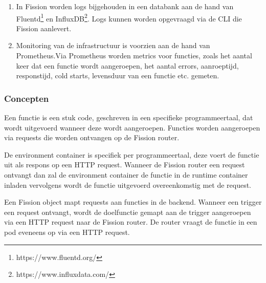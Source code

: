 \begin{enumerate}
    \item In Fission worden logs bijgehouden in een databank aan de hand van Fluentd\footnote{https://www.fluentd.org/} en InfluxDB\footnote{https://www.influxdata.com/}. Logs kunnen worden opgevraagd via de CLI die Fission aanlevert.
    \item Monitoring van de infrastructuur is voorzien aan de hand van Prometheus.Via Prometheus worden metrics voor functies, zoals het aantal keer dat een functie wordt aangeroepen, het aantal errors, aanroeptijd, responstijd, cold starts, levensduur van een functie etc. gemeten.
\end{enumerate}

\subsubsection{Concepten}
\begin{description}[style=unboxed, labelwidth=\linewidth, listparindent =0pt]
    \item[Functie]
    Een functie is een stuk code, geschreven in een specifieke programmeertaal, dat wordt uitgevoerd wanneer deze wordt aangeroepen. Functies worden aangeroepen via requests die worden ontvangen op de Fission router. \autocite{Fission2018}
    \\
    
    \item[Environment]
    De environment container is specifiek per programmeertaal, deze voert de functie uit als respons op een HTTP request. Wanneer de Fission router een request ontvangt dan zal de environment container de functie in de runtime container inladen vervolgens wordt de functie uitgevoerd overeenkomstig met de request. \autocite{Fission2018}
    \\
    
    \item[Trigger]
    Een Fission object mapt requests aan functies in de backend. Wanneer een trigger een request ontvangt, wordt de doelfunctie gemapt aan de trigger aangeroepen via een HTTP request naar de Fission router. De router vraagt de functie in een pod eveneens op via een HTTP request. \autocite{Fission2018}
    \\
\end{description}


